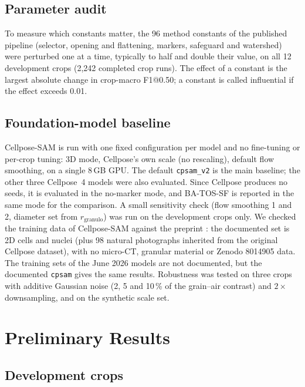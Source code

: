 \documentclass[12pt]{article}
\newcommand{\SF}{BA-TOS-SF}
\newcommand{\CP}{Cellpose-SAM}
\newcommand{\rg}{r_{\mathrm{granulo}}}
\begin{document}
\subsection{Parameter audit}
\label{sec:audit}

To measure which constants matter, the 96 method constants of the published pipeline (selector, opening and
flattening, markers, safeguard and watershed) were perturbed one at a time, typically to half and double their
value, on all 12 development crops (2,242 completed crop runs). The effect of a constant is the largest absolute change
in crop-macro F1@0.50; a constant is called influential if the effect exceeds 0.01.

\subsection{Foundation-model baseline}

\CP{} is run with one fixed configuration per model and no fine-tuning or per-crop tuning: 3D mode, Cellpose's own
scale (no rescaling), default flow smoothing, on a single 8\,GB GPU. The default \texttt{cpsam\_v2} is the main
baseline; the other three Cellpose~4 models were also evaluated. Since Cellpose produces no seeds, it is evaluated
in the no-marker mode, and \SF{} is reported in the same mode for the comparison. A small sensitivity check (flow
smoothing 1 and 2, diameter set from $\rg$) was run on the development crops only. We checked the training data of
Cellpose-SAM against the preprint \citep{pachitariu2025}: the documented set is 2D cells and nuclei (plus 98
natural photographs inherited from the original Cellpose dataset), with no micro-CT, granular material or Zenodo
8014905 data. The training sets of the June 2026 models are not documented, but the documented \texttt{cpsam}
gives the same results. Robustness was tested on three crops with additive Gaussian noise (2, 5 and 10\,\% of the
grain--air contrast) and $2\times$ downsampling, and on the synthetic scale set.

\section{Preliminary Results}

\subsection{Development crops}
\end{document}
